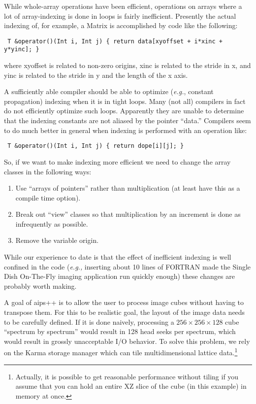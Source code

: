 While whole-array operations have been efficient, operations on arrays
where a lot of array-indexing is done in loops is fairly inefficient.
Presently the actual indexing of, for example, a Matrix is 
accomplished by code like the following:
\begin{verbatim}
 T &operator()(Int i, Int j) { return data[xyoffset + i*xinc + y*yinc]; }
\end{verbatim}
where xyoffset is related to non-zero origins, xinc is related to the
stride in x, and yinc is related to the stride in y and the length of
the x axis.

A sufficiently able compiler should be able to optimize ({\em e.g.},
constant propagation) indexing when it is in tight loops. Many (not
all) compilers in fact do not efficiently optimize such
loops. Apparently they are unable to determine that the indexing
constants are not aliased by the pointer ``data.'' Compilers seem to
do much better in general when indexing is performed with an operation
like:
\begin{verbatim}
 T &operator()(Int i, Int j) { return dope[i][j]; }
\end{verbatim}

So, if we want to make indexing more efficient we need to change the
array classes in the following ways:
\begin{enumerate}
	\item Use ``arrays of pointers'' rather than multiplication
	(at least have this as a compile time option).
	\item Break out ``view'' classes so that multiplication by an
	increment is done as infrequently as possible.
	\item Remove the variable origin.
\end{enumerate}

While our experience to date is that the effect of inefficient
indexing is well confined in the code ({\em e.g.,} inserting about 10
lines of FORTRAN made the Single Dish On-The-Fly imaging application
run quickly enough) these changes are probably worth making.

A goal of {\sc aips++} is to allow the user to process image cubes
without having to transpose them. For this to be realistic goal, the
layout of the image data needs to be carefully defined. If it is done
naively, processing a $256\times256\times128$ cube ``spectrum by
spectrum'' would result in 128 head seeks per spectrum, which would
result in grossly unacceptable I/O behavior. To solve this problem, we
rely on the Karma storage manager which can tile multidimensional
lattice data.\footnote{Actually, it is possible to get reasonable
performance without tiling if you assume that you can hold an entire
XZ slice of the cube (in this example) in memory at once.}

